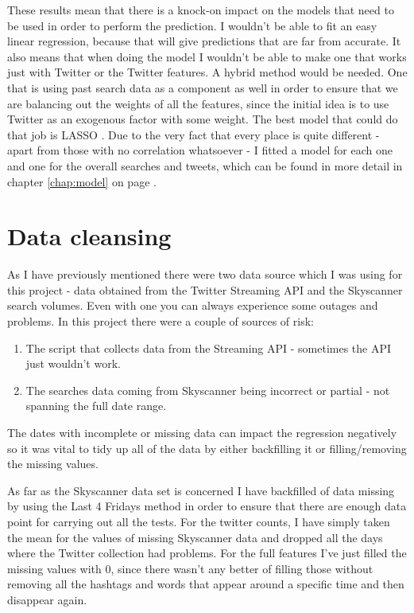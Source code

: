 \documentclass[minf,frontabs,twoside,singlespacing,parskip]{infthesis}
\begin{document}
These results mean that there is a knock-on impact on the models that need to be used in order to perform the prediction. I wouldn't be able to fit an easy linear regression, because that will give predictions that are far from accurate. It also means that when doing the model I wouldn't be able to make one that works just with Twitter or the Twitter features. A hybrid method would be needed. One that is using past search data as a component as well in order to ensure that we are balancing out the weights of all the features, since the initial idea is to use Twitter as an exogenous factor with some weight. The best model that could do that job is LASSO \cite{lasso}. Due to the very fact that every place is quite different - apart from those with no correlation whatsoever - I fitted a model for each one and one for the overall searches and tweets, which can be found in more detail in chapter \ref{chap:model} on page \pageref{chap:model}.


\section{Data cleansing}
\label{sec:cleansing}


As I have previously mentioned there were two data source which I was using for this project - data obtained from the Twitter Streaming API and the Skyscanner search volumes. Even with one you can always experience some outages and problems. In this project there were a couple of sources of risk:
\begin{enumerate}
\item The script that collects data from the Streaming API - sometimes the API just wouldn't work. 
\item The searches data coming from Skyscanner being incorrect or partial - not spanning the full date range.
\end{enumerate}


The dates with incomplete or missing data can impact the regression negatively so it was vital to tidy up all of the data by either backfilling it or filling/removing the missing values. 

As far as the Skyscanner data set is concerned I have backfilled of data missing by using the Last 4 Fridays method in order to ensure that there are enough data point for carrying out all the tests. For the twitter counts, I have simply taken the mean for the values of missing Skyscanner data and dropped all the days where the Twitter collection had problems. For the full features I've just filled the missing values with 0, since there wasn't any better of filling those without removing all the hashtags and words that appear around a specific time and then disappear again.
\end{document}
